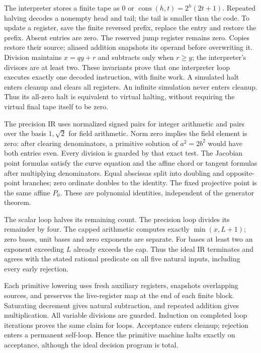 The interpreter stores a finite tape as
$0$ or $\operatorname{cons}(h,t)=2^h(2t+1)$.
Repeated halving decodes a nonempty head and tail; the tail is smaller
than the code. To update a register, save the finite reversed prefix,
replace the entry and restore the prefix. Absent entries are zero.
The reserved jump register remains zero. Copies restore their source;
aliased addition snapshots its operand before overwriting it.
Division maintains $x=qy+r$ and subtracts only when $r\ge y$;
the interpreter's divisors are at least two.
These invariants prove that one interpreter loop executes exactly one
decoded instruction, with finite work. A simulated halt enters cleanup
and clears all registers. An infinite simulation never enters cleanup.
Thus its all-zero halt is equivalent to virtual halting, without
requiring the virtual final tape itself to be zero.

The precision IR uses normalized signed pairs for integer arithmetic
and pairs over the basis $1,\sqrt2$ for field arithmetic.
Norm zero implies the field element is zero: after clearing
denominators, a primitive solution of $a^2=2b^2$ would have both
entries even. Every division is guarded by that exact test.
The Jacobian point formulas satisfy the curve equation and the affine
chord or tangent formulas after multiplying denominators.
Equal abscissas split into doubling and opposite-point branches;
zero ordinate doubles to the identity. The fixed projective point
is the same affine $P_0$. These are polynomial identities, independent
of the generator theorem.

The scalar loop halves its remaining count. The precision loop divides
its remainder by four. The capped arithmetic computes exactly
$\min(x,L+1)$; zero bases, unit bases and zero exponents are separate.
For bases at least two an exponent exceeding $L$ already exceeds the
cap. Thus the ideal IR terminates and agrees with the stated rational
predicate on all five natural inputs, including every early rejection.

Each primitive lowering uses fresh auxiliary registers, snapshots
overlapping sources, and preserves the live-register map at the end
of each finite block. Saturating decrement gives natural subtraction,
and repeated addition gives multiplication. All variable divisions
are guarded. Induction on completed loop iterations proves the same
claim for loops. Acceptance enters cleanup; rejection enters a
permanent self-loop. Hence the primitive machine halts exactly on
acceptance, although the ideal decision program is total.


